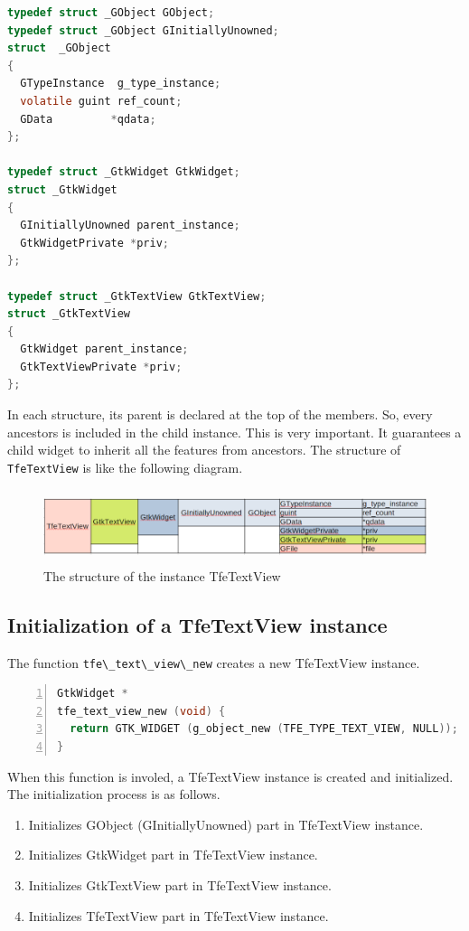 \begin{lstlisting}[language=C]
typedef struct _GObject GObject;
typedef struct _GObject GInitiallyUnowned;
struct  _GObject
{
  GTypeInstance  g_type_instance;
  volatile guint ref_count;
  GData         *qdata;
};

typedef struct _GtkWidget GtkWidget;
struct _GtkWidget
{
  GInitiallyUnowned parent_instance;
  GtkWidgetPrivate *priv;
};

typedef struct _GtkTextView GtkTextView;
struct _GtkTextView
{
  GtkWidget parent_instance;
  GtkTextViewPrivate *priv;
};
\end{lstlisting}

In each structure, its parent is declared at the top of the members. So,
every ancestors is included in the child instance. This is very
important. It guarantees a child widget to inherit all the features from
ancestors. The structure of \passthrough{\lstinline!TfeTextView!} is
like the following diagram.

\begin{figure}
\centering
\includegraphics[width=14.39cm,height=2.16cm]{../image/TfeTextView.png}
\caption{The structure of the instance TfeTextView}
\end{figure}

\hypertarget{initialization-of-a-tfetextview-instance}{%
\subsection{Initialization of a TfeTextView
instance}\label{initialization-of-a-tfetextview-instance}}

The function \passthrough{\lstinline!tfe\_text\_view\_new!} creates a
new TfeTextView instance.

\begin{lstlisting}[language=C, numbers=left]
GtkWidget *
tfe_text_view_new (void) {
  return GTK_WIDGET (g_object_new (TFE_TYPE_TEXT_VIEW, NULL));
}
\end{lstlisting}

When this function is involed, a TfeTextView instance is created and
initialized. The initialization process is as follows.

\begin{enumerate}
\def\labelenumi{\arabic{enumi}.}
\tightlist
\item
  Initializes GObject (GInitiallyUnowned) part in TfeTextView instance.
\item
  Initializes GtkWidget part in TfeTextView instance.
\item
  Initializes GtkTextView part in TfeTextView instance.
\item
  Initializes TfeTextView part in TfeTextView instance.
\end{enumerate}

